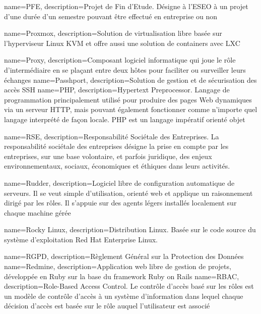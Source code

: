 {
    name=PFE,
    description={Projet de Fin d'Etude. Désigne à l'ESEO à un projet d'une durée d'un semestre pouvant être effectué en entreprise ou non}
}

{
    name=Proxmox,
    description={Solution de virtualisation libre basée sur l'hyperviseur Linux KVM et offre aussi une solution de containers avec LXC}
}

{
    name=Proxy,
    description={Composant logiciel informatique qui joue le rôle d'intermédiaire en se plaçant entre deux hôtes pour faciliter ou surveiller leurs échanges}
}
{
    name=Passhport,
    description={Solution de gestion et de sécurisation des accès SSH}
}
{
    name=PHP,
    description={Hypertext Preprocessor. Langage de programmation principalement utilisé pour produire des pages Web dynamiques via un serveur HTTP, mais pouvant également fonctionner comme n'importe quel langage interprété de façon locale. PHP est un langage impératif orienté objet}
}



{
    name=RSE,
    description={Responsabilité Sociétale des Entreprises. La responsabilité sociétale des entreprises désigne la prise en compte par les entreprises, sur une base volontaire, et parfois juridique, des enjeux environnementaux, sociaux, économiques et éthiques dans leurs activités.}
}

{
    name=Rudder,
    description={Logiciel libre de configuration automatique de serveurs. Il se veut simple d'utilisation, orienté web et applique un raisonnement dirigé par les rôles. Il s'appuie sur des agents légers installés localement sur chaque machine gérée}
}

{
    name=Rocky Linux,
    description={Distribution Linux. Basée sur le code source du système d'exploitation Red Hat Enterprise Linux.}
}

{
    name=RGPD,
    description={Règlement Général sur la Protection des Données}
}
{
    name=Redmine,
    description={Application web libre de gestion de projets, développée en Ruby sur la base du framework Ruby on Rails}
}
{
    name=RBAC,
    description={Role-Based Access Control. Le contrôle d'accès basé sur les rôles est un modèle de contrôle d'accès à un système d'information dans lequel chaque décision d'accès est basée sur le rôle auquel l'utilisateur est associé}
}


